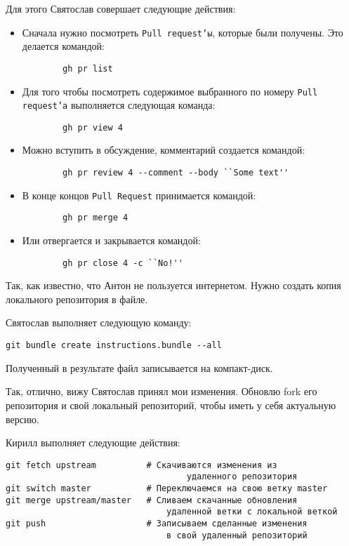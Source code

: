 \documentclass[14pt,a4paper]{article}
\begin{document}
Для этого Святослав совершает следующие действия:
\begin{itemize}
	\item Сначала нужно посмотреть \texttt{Pull request'ы}, которые были получены.
		Это делается командой:
		\begin{verbatim}
		gh pr list
		\end{verbatim}
	\item Для того чтобы посмотреть содержимое выбранного по номеру \texttt{Pull request'а}
		выполняется следующая команда:
		\begin{verbatim}
		gh pr view 4
		\end{verbatim}
	\item Можно вступить в обсуждение, комментарий создается командой:
		\begin{verbatim}
		gh pr review 4 --comment --body ``Some text''
		\end{verbatim}
	\item В конце концов \texttt{Pull Request} принимается командой:
		\begin{verbatim}
		gh pr merge 4 
		\end{verbatim}
	\item Или отвергается и закрывается командой:
		\begin{verbatim}
		gh pr close 4 -c ``No!''
		\end{verbatim}
\end{itemize}
Так, как известно, что Антон не пользуется интернетом. Нужно создать копия локального 
репозитория в файле. 

Святослав выполняет следующую команду:

\begin{verbatim}
git bundle create instructions.bundle --all
\end{verbatim}

Полученный в результате файл записывается на компакт-диск.


 Так, отлично, вижу Святослав принял мои изменения. Обновлю fork его 
репозитория и свой локальный репозиторий, чтобы иметь у себя актуальную версию.

Кирилл выполняет следующие действия:
\begin{verbatim}
git fetch upstream			# Скачиваются изменения из 
									удаленного репозитория
git switch master			# Переключаемся на свою ветку master
git merge upstream/master	# Сливаем скачанные обновления 
								удаленной ветки с локальной веткой
git push					# Записываем сделанные изменения
								в свой удаленный репозиторий
\end{verbatim}
\end{document}
